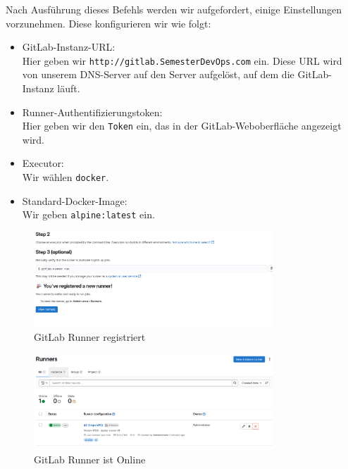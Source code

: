 \documentclass[a4paper,12pt]{article}
\begin{document}
Nach Ausführung dieses Befehls werden wir aufgefordert, einige Einstellungen vorzunehmen. Diese konfigurieren wir wie folgt:
\begin{itemize}
\item GitLab-Instanz-URL: 
	\\ Hier geben wir \texttt{http://gitlab.SemesterDevOps.com} ein. Diese URL wird von unserem DNS-Server auf den Server aufgelöst, auf dem die GitLab-Instanz läuft.
\item Runner-Authentifizierungstoken: 
	\\ Hier geben wir den \texttt{Token} ein, das in der GitLab-Weboberfläche angezeigt wird.
\item Executor: 
	\\ Wir wählen \texttt{docker}.
\item Standard-Docker-Image: 
	\\ Wir geben \texttt{alpine:latest} ein.
\end{itemize}

\begin{figure}[H]
	\centering
	\includegraphics[width=0.8\textwidth]{data/RUNNER_GEHT.png}
	\caption{GitLab Runner registriert}
	\label{fig:GitLab Runner registriert}
\end{figure}
\begin{figure}[H]
	\centering
	\includegraphics[width=0.8\textwidth]{data/RUNNER_ONLINE.png}
	\caption{GitLab Runner ist Online}
	\label{fig:GitLab Runner ist Online}
\end{figure}


\newpage
{}
\listoffigures
\newpage
{}
\listoftables
\end{document}
